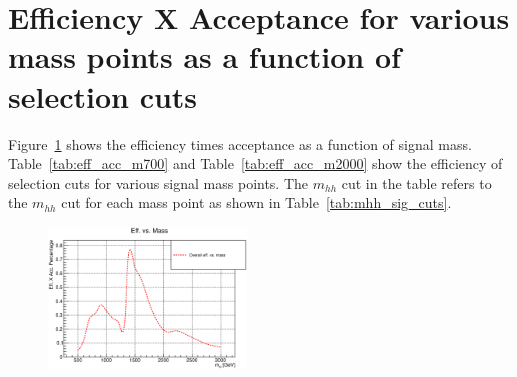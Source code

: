 \section{Efficiency X Acceptance for various mass points as a function of selection cuts}
Figure~\ref{fig:eff_mass} shows the efficiency times acceptance as a function of signal mass. 
Table~\ref{tab:eff_acc_m700}  and Table~\ref{tab:eff_acc_m2000} show the efficiency of selection cuts for various signal mass points. The $m_{hh}$ cut in the table refers to the $m_{hh}$ cut for each mass point as shown in Table~\ref{tab:mhh_sig_cuts}.

\begin{figure}[!h]
\label{fig:eff_mass}
\begin{center}
\includegraphics*[width=0.47\textwidth] {figures/eff_vs_mass}
\end{center}
\end{figure}

